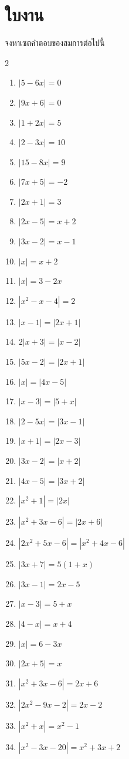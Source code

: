 \section*{ใบงาน}
จงหาเซตคำตอบของสมการต่อไปนี้
\begin{multicols}{2}
\begin{enumerate}[label=\arabic*., leftmargin=*]
	\item $|5 - 6x| = 0$
	\item $|9x + 6| = 0$
	\item $|1+2x| = 5$
	\item $|2 - 3x| = 10$
	\item $|15 - 8x| = 9$
	\item $|7x + 5| = -2$
	\item $\left|2 x+1\right|=3$
	\item $\left|2 x-5\right|=x+2$
	\item $\left|3 x-2\right|=x-1$
	\item $\left|x\right|=x+2$
	\item $\left|x\right|=3-2 x$
	\item $\left|x^2-x-4\right|=2$
	\item $\left|x-1\right|=\left|2 x+1\right|$
	\item $2\left|x+3\right|=\left|x-2\right|$
	\item $|5x - 2| = |2x + 1|$
	\item $|x| = |4x - 5|$
	\item $|x - 3| = |5 + x|$
	\item $|2 - 5x| = |3x - 1|$
	\item $|x + 1| = |2x - 3|$
	\item $|3x - 2| = |x + 2|$
	\item $|4x - 5| = |3x + 2|$
	\item $|x^2 + 1| = |2x|$
	\item $|x^2 + 3x - 6| = |2x + 6|$
	\item $|2x^2 + 5x - 6| = |x^2 + 4x - 6|$
	\item $|3x + 7| = 5(1+x)$
	\item $|3x - 1| = 2x - 5$
	\item $|x - 3| = 5 + x$
	\item $|4 - x| = x + 4$
	\item $|x| = 6 - 3x$
	\item $|2x + 5| = x$
	\item $|x^2 + 3x - 6| = 2x + 6$
	\item $|2x^2 - 9x - 2| = 2x - 2$
	\item $|x^2 + x| = x^2 - 1$
	\item $|x^2 - 3x - 20| = x^2 + 3x + 2$
\end{enumerate}
\end{multicols}
\newpage

